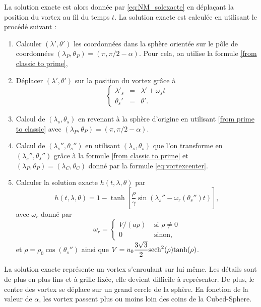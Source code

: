 La solution exacte est alors donnée par \eqref{eq:NM_solexacte} en déplaçant la position du vortex au fil du temps $t$.
La solution exacte est calculée en utilisant le procédé suivant :
\begin{enumerate}
\item Calculer $(\lambda', \theta')$ les coordonnées dans la sphère orientée sur le pôle de coordonnées $(\lambda_P, \theta_P) = (\pi, \pi/2 - \alpha)$. Pour cela, on utilise la formule \eqref{from classic to prime},

\item Déplacer $(\lambda', \theta')$ sur la position du vortex grâce à
\begin{equation}
\left\lbrace
\begin{array}{rcl}
\lambda'_s & = & \lambda' + \omega_s t \\
\theta_s' & = & \theta'.
\end{array}
\right.
\label{eq:vortexcenter}
\end{equation}

\item Calcul de $(\lambda_s, \theta_s)$ en revenant à la sphère d'origine en utilisant \eqref{from prime to classic} avec $(\lambda_P, \theta_P) = (\pi, \pi/2 - \alpha)$.

\item Calcul de $(\lambda_s'', \theta_s'')$ en utilisant $(\lambda_s, \theta_s)$ que l'on transforme en $(\lambda_s'', \theta_s'')$ grâce à la formule \eqref{from classic to prime} et $(\lambda_P, \theta_P) = (\lambda_C, \theta_C)$ donné par la formule \eqref{eq:vortexcenter}.

\item Calculer la solution exacte $h(t,\lambda, \theta)$ par
\begin{equation}
h(t,\lambda, \theta) = 1 - \tanh \left[ \dfrac{\rho}{\gamma} \sin (\lambda_s'' - \omega_r(\theta_s'')t) \right],
\label{eq:NJ_solexacte}
\end{equation}
avec $\omega_r$ donné par
\begin{equation}
\omega_r = \left\lbrace
\begin{array}{cl}
V/(a \rho) & \text{ si } \rho \neq 0 \\
0 & \text{ sinon,}
\end{array}
\right.
\end{equation}
et $\rho = \rho_0 \cos (\theta_s'')$ ainsi que $V = u_0 \dfrac{3\sqrt{3}}{2} \text{sech}^2(\rho) \text{tanh}(\rho)$.
\end{enumerate}
La solution exacte représente un vortex s'enroulant sur lui même. Les détails sont de plus en plus fins et à grille fixée, elle devient difficile à représenter. De plus, le centre des vortex se déplace sur un grand cercle de la sphère. En fonction de la valeur de $\alpha$, les vortex passent plus ou moins loin des coins de la Cubed-Sphere.

